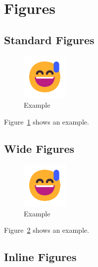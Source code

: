 \documentclass[letterpaper]{article}
\begin{document}
\tableofcontents

\twocolumn

\section{Figures}


\subsection{Standard Figures}

\begin{figure}
    \centering
    \includegraphics[width=0.2\textwidth]{assets/example.pdf}
    \caption{Example}
    \label{fig:standard}
\end{figure}

Figure~\ref{fig:standard} shows an example.


\subsection{Wide Figures}

\begin{figure}
    \centering
    \includegraphics[width=0.2\textwidth]{assets/example.pdf}
    \caption{Example}
    \label{fig:wide}
\end{figure}

Figure~\ref{fig:wide} shows an example.



\subsection{Inline Figures}
\end{document}
